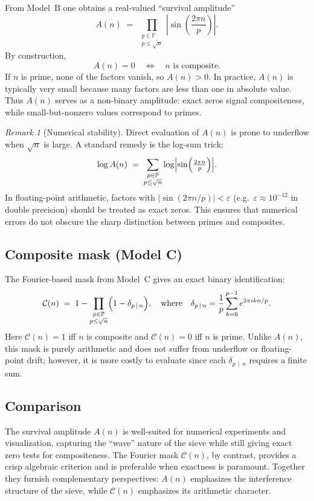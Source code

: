 \documentclass[12pt]{article}
\theoremstyle{definition}
\theoremstyle{remark}
\newtheorem{remark}{Remark}
\newcommand{\Primes}{\mathbb{P}}
\newcommand{\divides}{\,\mid\,}
\begin{document}
From Model~B one obtains a real-valued ``survival amplitude''
\[
A(n)\;=\;\prod_{\substack{p\in\Primes\\ p\le \sqrt{n}}}
\left|\sin\!\left(\frac{2\pi n}{p}\right)\right|.
\]
By construction,
\[
A(n)=0 \quad \iff \quad n \text{ is composite}.
\]
If $n$ is prime, none of the factors vanish, so $A(n)>0$. In practice, $A(n)$ is typically very small because many factors are less than one in absolute value. Thus $A(n)$ serves as a non-binary amplitude: exact zeros signal compositeness, while small-but-nonzero values correspond to primes.

\begin{remark}[Numerical stability]
Direct evaluation of $A(n)$ is prone to underflow when $\sqrt{n}$ is large. A standard remedy is the log-sum trick:
\[
\log A(n) \;=\; \sum_{\substack{p\in\Primes\\ p\le \sqrt{n}}}
\log \Bigl|\sin\!\left(\tfrac{2\pi n}{p}\right)\Bigr|.
\]
In floating-point arithmetic, factors with $|\sin(2\pi n/p)|<\varepsilon$ (e.g.\ $\varepsilon \approx 10^{-12}$ in double precision) should be treated as exact zeros. This ensures that numerical errors do not obscure the sharp distinction between primes and composites.
\end{remark}

\subsection{Composite mask (Model C)}

The Fourier-based mask from Model~C gives an exact binary identification:
\[
\mathcal{C}(n) \;=\; 
1 - \prod_{\substack{p\in\Primes\\ p\le \sqrt{n}}}
\Bigl(1 - \delta_{p\divides n}\Bigr),
\quad\text{where}\quad
\delta_{p\divides n}
= \frac{1}{p}\sum_{k=0}^{p-1} e^{2\pi i k n/p}.
\]
Here $\mathcal{C}(n)=1$ iff $n$ is composite and $\mathcal{C}(n)=0$ iff $n$ is prime. Unlike $A(n)$, this mask is purely arithmetic and does not suffer from underflow or floating-point drift; however, it is more costly to evaluate since each $\delta_{p\divides n}$ requires a finite sum.

\subsection{Comparison}

The survival amplitude $A(n)$ is well-suited for numerical experiments and visualization, capturing the ``wave'' nature of the sieve while still giving exact zero tests for compositeness. The Fourier mask $\mathcal{C}(n)$, by contrast, provides a crisp algebraic criterion and is preferable when exactness is paramount. Together they furnish complementary perspectives: $A(n)$ emphasizes the interference structure of the sieve, while $\mathcal{C}(n)$ emphasizes its arithmetic character.
\end{document}
